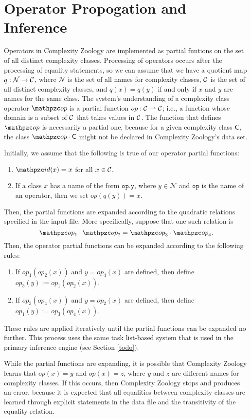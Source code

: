 \section{Operator Propogation and Inference}

Operators in Complexity Zoology are implemented as partial funtions on the set
of all distinct complexity classes. Processing of operators occurs after the
processing of equality statements, so we can assume that we have a quotient map
$q:\mathcal{N}\rightarrow\mathcal{C}$, where $\mathcal{N}$ is the set of all names for complexity
classes, $\mathcal{C}$ is the set of all distinct complexity classes, and $q(x)=q(y)$ if
and only if $x$ and $y$ are names for the same class. The system's understanding
of a complexity class operator $\op$ is a partial function
$op:\mathcal{C}\rightharpoonup\mathcal{C}$; i.e., a function whose domain is a subset of $\mathcal{C}$
that takes values in $\mathcal{C}$. The function that defines $\op$ is necessarily a
partial one, because for a given complexity class $\mathsf{C}$, the class $\op\cdot\sC$
might not be declared in Complexity Zoology's data set.

Initially, we assume that the following is true of our operator partial
functions:
\begin{enumerate}
\item $\id(x)=x$ for all $x\in\mathcal{C}$.
\item If a class $x$ has a name of the form $\mathtt{op.y}$, where $y\in\mathcal{N}$ and
  $\mathtt{op}$ is the name of an operator, then we set $op(q(y))=x$.
\end{enumerate}
Then, the partial functions are expanded according to the quadratic relations
specified in the input file. More specifically, suppose that one such relation
is
\[
\op_1\cdot\op_2=\op_3\cdot\op_4.
\]
Then, the operator partial functions can be expanded according to the following
rules:
\begin{enumerate}
\item If $op_1(op_2(x))$ and $y=op_4(x)$ are defined, then define
  $op_3(y):=op_1(op_2(x))$.
\item If $op_3(op_4(x))$ and $y=op_2(x)$ are defined, then define
  $op_1(y):=op_3(op_4(x))$.
\end{enumerate}
These rules are applied iteratively until the partial functions can be expanded
no further. This process uses the same task list-based system that is used in
the primary inference engine (see Section \ref{todo}).

While the partial functions are expanding, it is possible that Complexity Zoology 
learns that $op(x)=y$ and $op(x)=z$, where $y$ and $z$ are different names for 
complexity classes. If this occurs, then Complexity Zoology stops and produces an 
error, because it is expected that all equalities between complexity classes are 
learned through explicit statements in the data file and the transitivity of the 
equality relation.